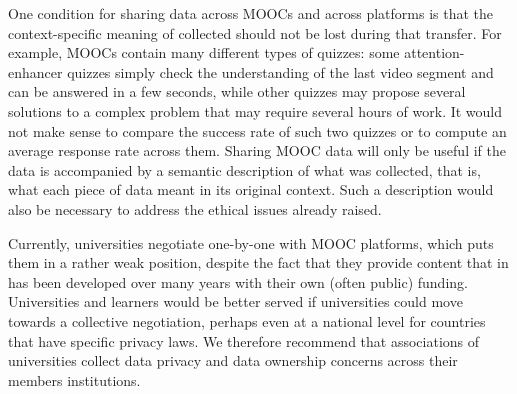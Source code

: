 One condition for sharing data across MOOCs and across platforms is that
the context-specific meaning of collected should not be lost during that
transfer. For example, MOOCs contain many different types of
quizzes: some attention-enhancer quizzes simply check the understanding
of the last video segment and can be answered in a few seconds, while
other quizzes may propose several solutions to a complex problem that
may require several hours of work. It would not make sense to compare
the success rate of such two quizzes or to compute an average response
rate across them. Sharing MOOC data will only be useful if the data is
accompanied by a semantic description of what was collected, that is,
what each piece of data meant in its original context. Such a
description would also be necessary to address the ethical issues
already raised.

Currently, universities negotiate one-by-one with MOOC platforms, which
puts them in a rather weak position, despite the fact that they provide
content that in has been developed over many years with their own (often
public) funding.  Universities and learners would be better served
if universities could move towards a collective negotiation, perhaps
even at a national level
for countries that have specific privacy laws.
We therefore recommend that associations of universities collect data
privacy and 
data ownership concerns across their members institutions.

